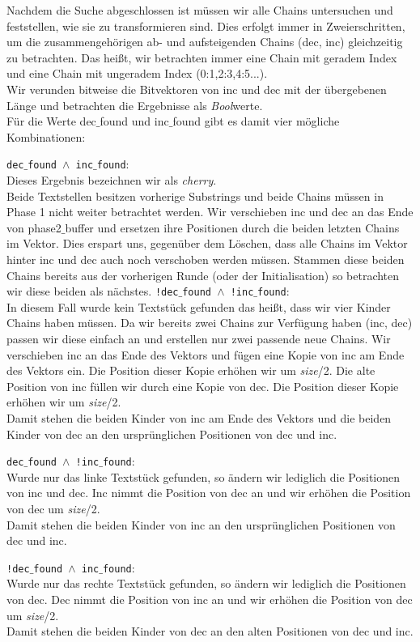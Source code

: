 \noindent
Nachdem die Suche abgeschlossen ist müssen wir alle Chains untersuchen und feststellen, wie sie zu transformieren sind. Dies erfolgt immer in Zweierschritten, um die zusammengehörigen ab- und aufsteigenden Chains (dec, inc) gleichzeitig zu betrachten. Das heißt, wir betrachten immer eine Chain mit geradem Index und eine Chain mit ungeradem Index (0:1,2:3,4:5...). \\
Wir verunden bitweise die Bitvektoren von inc und dec mit der übergebenen Länge  und betrachten die Ergebnisse als \textit{Bool}werte.\\
\newpage
Für die Werte dec$\_$found und inc$\_$found gibt es damit vier mögliche Kombinationen:
\begin{outline}
	\1[]\texttt{dec$\_$found $\land$ inc$\_$found}:\\
		 Dieses Ergebnis bezeichnen wir als \textit{cherry}.\\
		 Beide Textstellen besitzen vorherige Substrings und beide Chains müssen in Phase 1 nicht weiter betrachtet werden. Wir verschieben inc und dec an das Ende von phase2$\_$buffer und ersetzen ihre Positionen durch die beiden letzten Chains im Vektor. Dies erspart uns, gegenüber dem Löschen, dass alle Chains im Vektor hinter inc und dec auch noch verschoben werden müssen.
		 Stammen diese beiden Chains bereits aus der vorherigen Runde (oder der Initialisation) so betrachten wir diese beiden als nächstes.
	\1[]\texttt{!dec$\_$found $\land$ !inc$\_$found}:\\
		In diesem Fall wurde kein Textstück gefunden das heißt, dass wir vier Kinder Chains haben müssen. Da wir bereits zwei Chains zur Verfügung haben (inc, dec)  passen wir diese einfach an und erstellen nur zwei passende neue Chains.
		Wir verschieben inc an das Ende des Vektors und fügen eine Kopie von inc am Ende des Vektors ein.
		Die Position dieser Kopie erhöhen wir um \textit{size}/2.
		Die alte Position von inc füllen wir durch eine Kopie von dec.
		Die Position dieser Kopie erhöhen wir um \textit{size}/2.\\
		Damit stehen die beiden Kinder von inc am Ende des Vektors und die beiden Kinder von dec an den ursprünglichen Positionen von dec und inc.
			
	\1[]\texttt{dec$\_$found $\land$ !inc$\_$found}:\\
		Wurde nur das linke Textstück gefunden, so ändern wir lediglich die Positionen von inc und dec.
		Inc nimmt die Position von dec an und wir erhöhen die Position von dec um \textit{size}/2.\\
		Damit stehen die beiden Kinder von inc an den ursprünglichen Positionen von dec und inc. 
	
	
	\1[]\texttt{!dec$\_$found $\land$ inc$\_$found}:\\
	Wurde nur das rechte Textstück gefunden, so ändern wir lediglich die Positionen von dec.
	Dec nimmt die Position von inc an und wir erhöhen die Position von dec um \textit{size}/2.\\
	Damit stehen die beiden Kinder von dec an den alten Positionen von dec und inc.
		
\end{outline}

